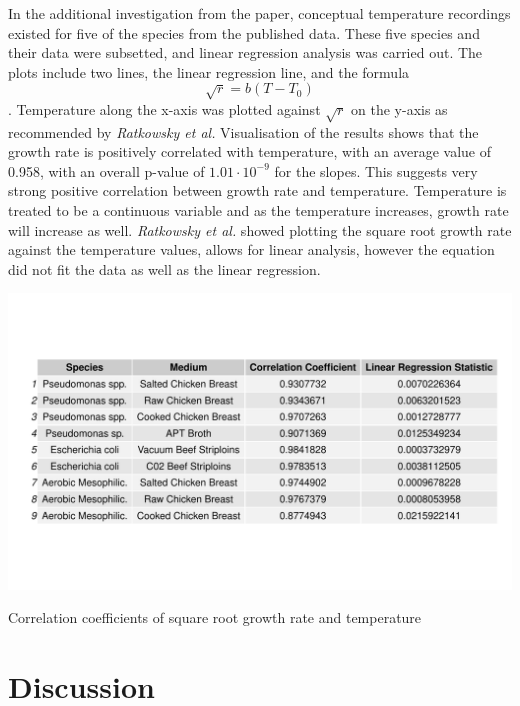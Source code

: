 \documentclass[11pt]{article}
\begin{document}
In the additional investigation from the paper, conceptual temperature recordings existed for five of the species from the published data. These five species and their data were subsetted, and linear regression analysis was carried out. The plots include two lines, the linear regression line, and the formula \begin{equation*}\sqrt{r}=b(T-T_0)\end{equation*}\cite{ratkowsky1982relationship}. Temperature along the x-axis was plotted against $\sqrt{r}$ on the y-axis as recommended by \textit{Ratkowsky et al.} Visualisation of the results shows that the growth rate is positively correlated with temperature, with an average value of 0.958, with an overall p-value of $1.01\cdot10^{-9}$ for the slopes. This suggests very strong positive correlation between growth rate and temperature. Temperature is treated to be a continuous variable and as the temperature increases, growth rate will increase as well. \textit{Ratkowsky et al.} showed plotting the square root growth rate against the temperature values, allows for linear analysis, however the equation did not fit the data as well as the linear regression.
\begin{table}[h!]
\centering
\includegraphics[scale=0.40]{../Results/Temperature_Growthrate.pdf} \caption{Correlation coefficients of square root growth rate and temperature} \label{tab:Correlation Table}
\end{table}

\section{Discussion}
\end{document}
